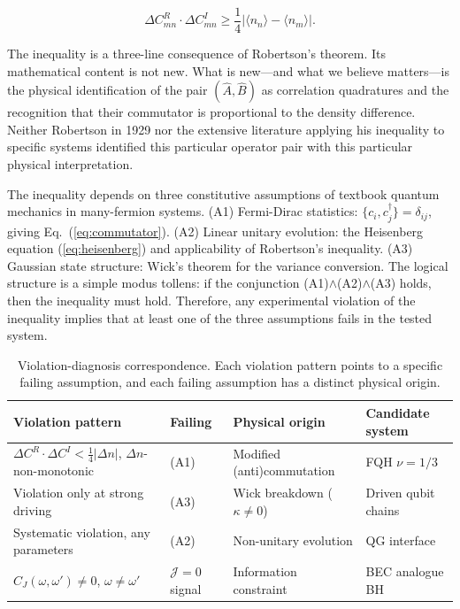 \documentclass[aps,prd,reprint,superscriptaddress,twocolumn]{revtex4-2}
\begin{document}
\begin{equation}
\boxed{\Delta C^R_{mn} \cdot \Delta C^I_{mn} \geq \frac{1}{4}|\langle n_n\rangle - \langle n_m\rangle|}.
\label{eq:inequality}
\end{equation}

The inequality is a three-line consequence of Robertson's theorem. Its mathematical content is not new. What is new---and what we believe matters---is the physical identification of the pair $(\hat{A},\hat{B})$ as correlation quadratures and the recognition that their commutator is proportional to the density difference. Neither Robertson in 1929 nor the extensive literature applying his inequality to specific systems identified this particular operator pair with this particular physical interpretation.

The inequality depends on three constitutive assumptions of textbook quantum mechanics in many-fermion systems. (A1) Fermi-Dirac statistics: $\{c_i, c^\dagger_j\} = \delta_{ij}$, giving Eq.~(\ref{eq:commutator}). (A2) Linear unitary evolution: the Heisenberg equation (\ref{eq:heisenberg}) and applicability of Robertson's inequality. (A3) Gaussian state structure: Wick's theorem for the variance conversion. The logical structure is a simple modus tollens: if the conjunction (A1)$\land$(A2)$\land$(A3) holds, then the inequality must hold. Therefore, any experimental violation of the inequality implies that at least one of the three assumptions fails in the tested system.

\begin{table}[h]
\caption{Violation-diagnosis correspondence. Each violation pattern points to a specific failing assumption, and each failing assumption has a distinct physical origin.}
\label{tab:diagnosis}
\begin{ruledtabular}
\begin{tabular}{p{2.8cm}p{1.5cm}p{2.2cm}p{1.8cm}}
Violation pattern & Failing & Physical origin & Candidate system \\
\hline
$\Delta C^R\!\cdot\!\Delta C^I < \frac{1}{4}|\Delta n|$, $\Delta n$-non-monotonic & (A1) & Modified (anti)commutation & FQH $\nu = 1/3$ \\
Violation only at strong driving & (A3) & Wick breakdown ($\kappa \neq 0$) & Driven qubit chains \\
Systematic violation, any parameters & (A2) & Non-unitary evolution & QG interface \\
$C_J(\omega,\omega') \neq 0$, $\omega \neq \omega'$ & $\mathcal{J}=0$ signal & Information constraint & BEC analogue BH \\
\end{tabular}
\end{ruledtabular}
\end{table}
\end{document}
